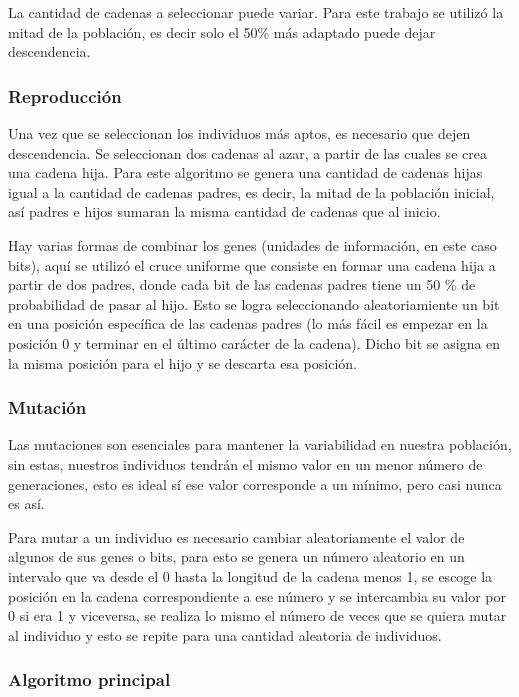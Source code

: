 \documentclass[12pt,letterpaper]{article}
\begin{document}
La cantidad de cadenas a seleccionar puede variar. Para este trabajo se utilizó la mitad de la población, es decir solo el 50\% más adaptado puede dejar descendencia.

\subsubsection*{Reproducción}

Una vez que se seleccionan los individuos más aptos, es necesario que dejen descendencia. Se seleccionan dos cadenas al azar, a partir de las cuales se crea una cadena hija. Para este algoritmo se genera una cantidad de cadenas hijas igual a la cantidad de cadenas padres, es decir, la mitad de la población inicial, así padres e hijos sumaran la misma cantidad de cadenas que al inicio.

Hay varias formas de combinar los genes (unidades de información, en este caso bits), aquí se utilizó el cruce uniforme que consiste en formar una cadena hija a partir de dos padres, donde cada bit de las cadenas padres tiene un 50 \% de probabilidad de pasar al hijo. Esto se logra seleccionando aleatoriamiente un bit en una posición específica de las cadenas padres (lo más fácil es empezar en la posición 0 y terminar en el último carácter de la cadena). Dicho bit se asigna en la misma posición para el hijo y se descarta esa posición.

\subsubsection*{Mutación}

Las mutaciones son esenciales para mantener la variabilidad en nuestra población, sin estas, nuestros individuos tendrán el mismo valor en un menor número de generaciones, esto es ideal sí ese valor corresponde a un mínimo, pero casi nunca es así.

Para mutar a un individuo es necesario cambiar aleatoriamente el valor de algunos de sus genes o bits, para esto se genera un número aleatorio en un intervalo que va desde el 0 hasta la longitud de la cadena menos 1, se escoge la posición en la cadena correspondiente a ese número y se intercambia su valor por 0 si era 1 y viceversa, se realiza lo mismo el número de veces que se quiera mutar al individuo y esto se repite para una cantidad aleatoria de individuos.

\subsubsection*{Algoritmo principal}
\end{document}
